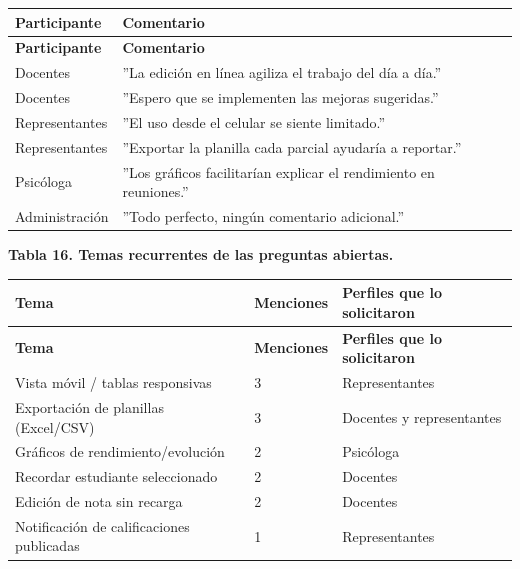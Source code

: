 \documentclass[11pt,a4paper]{article}
\begin{document}
{\small
\begin{longtable}{|p{}|p{}|}
\rowcolor{UTECblue}\color{white}\bfseries Participante & \color{white}\bfseries Comentario \\ \hline
\endfirsthead
\rowcolor{UTECblue}\color{white}\bfseries Participante & \color{white}\bfseries Comentario \\ \hline
\endhead
Docentes & ''La edición en línea agiliza el trabajo del día a día.'' \\ \hline
Docentes & ''Espero que se implementen las mejoras sugeridas.'' \\ \hline
Representantes & ''El uso desde el celular se siente limitado.'' \\ \hline
Representantes & ''Exportar la planilla cada parcial ayudaría a reportar.'' \\ \hline
Psicóloga & ''Los gráficos facilitarían explicar el rendimiento en reuniones.'' \\ \hline
Administración & ''Todo perfecto, ningún comentario adicional.'' \\ \hline
\end{longtable}}


\textbf{Tabla 16. Temas recurrentes de las preguntas abiertas.}


{\small
\begin{longtable}{|p{}|p{}|p{}|}
\rowcolor{UTECblue}\color{white}\bfseries Tema & \color{white}\bfseries Menciones & \color{white}\bfseries Perfiles que lo solicitaron \\ \hline
\endfirsthead
\rowcolor{UTECblue}\color{white}\bfseries Tema & \color{white}\bfseries Menciones & \color{white}\bfseries Perfiles que lo solicitaron \\ \hline
\endhead
Vista móvil / tablas responsivas & 3 & Representantes \\ \hline
Exportación de planillas (Excel/CSV) & 3 & Docentes y representantes \\ \hline
Gráficos de rendimiento/evolución & 2 & Psicóloga \\ \hline
Recordar estudiante seleccionado & 2 & Docentes \\ \hline
Edición de nota sin recarga & 2 & Docentes \\ \hline
Notificación de calificaciones publicadas & 1 & Representantes \\ \hline
\end{longtable}}
\end{document}
